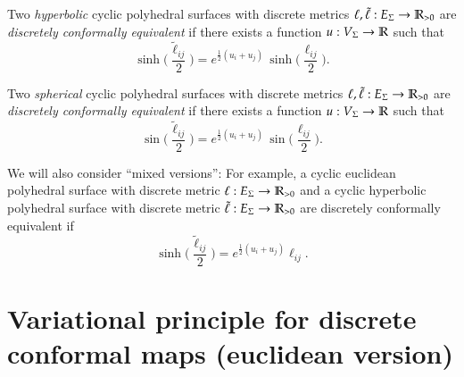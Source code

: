 \documentclass[Thesis.tex]{subfiles}
\begin{document}
  Two \emph{hyperbolic} cyclic polyhedral surfaces with
  discrete metrics $\ell,\tilde\ell:E_{\Sigma}\rightarrow\mathbb R_{>0}$ are
  \emph{discretely conformally equivalent} if there exists a function
  $u:V_{\Sigma}\rightarrow\mathbb R$ such that
  \begin{equation}
    \label{eq:tilde_ell_hyp}
    \sinh\Big(\frac{\tilde\ell_\mathit{ij}}{2}\Big)
    = e^{\frac{1}{2}(u_{i}+u_{j})}\,
    \sinh\Big(\frac{\ell_\mathit{ij}}{2}\Big).
  \end{equation}


  Two \emph{spherical} cyclic polyhedral surfaces with
  discrete metrics $\ell,\tilde\ell:E_{\Sigma}\rightarrow\mathbb R_{>0}$ are
  \emph{discretely conformally equivalent} if there exists a function
  $u:V_{\Sigma}\rightarrow\mathbb R$ such that
  \begin{equation}
    \label{eq:tilde_ell_sph}
    \sin\Big(\frac{\tilde\ell_\mathit{ij}}{2}\Big)
    = e^{\frac{1}{2}(u_{i}+u_{j})}\,
    \sin\Big(\frac{\ell_\mathit{ij}}{2}\Big).
  \end{equation}

  We will also consider ``mixed versions'': For example, a cyclic
  euclidean polyhedral surface with discrete metric
  $\ell:E_{\Sigma}\rightarrow\mathbb R_{>0}$ and a cyclic hyperbolic polyhedral
  surface with discrete metric $\tilde\ell:E_{\Sigma}\rightarrow\mathbb R_{>0}$
  are discretely conformally equivalent if
  \begin{equation*}
    \sinh\Big(\frac{\tilde\ell_\mathit{ij}}{2}\Big)
    = e^{\frac{1}{2}(u_{i}+u_{j})}\ell_\mathit{ij}.
  \end{equation*}




  \section{Variational principle for discrete conformal maps (euclidean version)}
  \label{sec:vari-princ}
\end{document}
